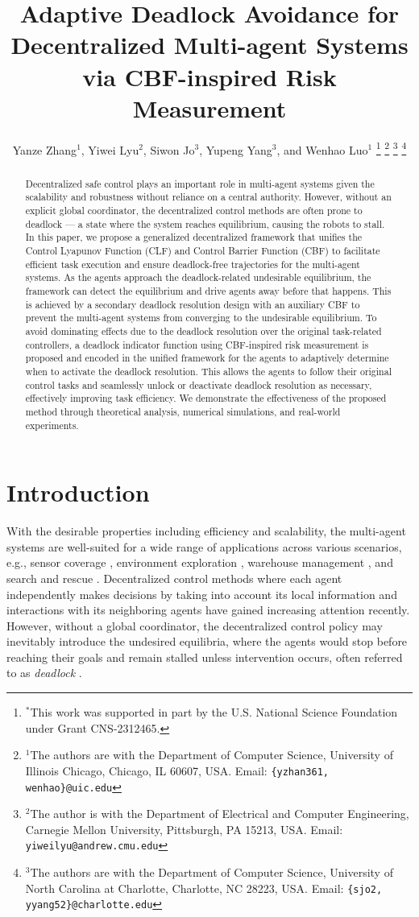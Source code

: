 \documentclass[letterpaper, 10 pt, conference]{ieeeconf}
\title{\LARGE \bf
Adaptive Deadlock Avoidance for Decentralized Multi-agent Systems via CBF-inspired Risk Measurement
}
\author{Yanze Zhang$^{1}$, Yiwei Lyu$^{2}$, Siwon Jo$^{3}$, Yupeng Yang$^{3}$, and Wenhao Luo$^{1}$
\thanks{$^*$This work was supported in part by the U.S. National Science Foundation under Grant CNS-2312465.}
\thanks{$^{1}$The authors are with the Department of Computer Science, University of Illinois Chicago, Chicago, IL 60607, USA. Email: {\tt\small \{yzhan361, wenhao\}@uic.edu}}
\thanks{$^{2}$The author is with the Department of Electrical and Computer Engineering, Carnegie Mellon University,
        Pittsburgh, PA 15213, USA. Email:
        {\tt\small yiweilyu@andrew.cmu.edu}}
\thanks{$^{3}$The authors are with the Department of Computer Science, University of North Carolina at Charlotte, Charlotte, NC 28223, USA. Email:
        {\tt\small \{sjo2, yyang52\}@charlotte.edu}}
}
\theoremstyle{plain}
\begin{document}
\maketitle
\thispagestyle{empty}
\pagestyle{empty}



\begin{abstract}
Decentralized safe control plays an important role in multi-agent systems given the scalability and robustness without reliance on a central authority. However, without an explicit global coordinator, the decentralized control methods are often prone to deadlock ---  a state where the system reaches equilibrium, causing the robots to stall. In this paper, we propose a generalized decentralized framework that unifies the Control Lyapunov Function (CLF) and Control Barrier Function (CBF) to facilitate efficient task execution and ensure deadlock-free trajectories for the multi-agent systems. As the agents approach the deadlock-related undesirable equilibrium, the framework can detect the equilibrium and drive agents away before that happens. This is achieved by a secondary deadlock resolution design with an auxiliary CBF to prevent the multi-agent systems from converging to the undesirable equilibrium. To avoid dominating effects due to the deadlock resolution over the original task-related controllers, a deadlock indicator function using CBF-inspired risk measurement is proposed and encoded in the unified framework for the agents to adaptively determine when to activate the deadlock resolution. This allows the agents to follow their original control tasks and seamlessly unlock or deactivate deadlock resolution as necessary, effectively improving task efficiency. We demonstrate the effectiveness of the proposed method through theoretical analysis, numerical simulations, and real-world experiments.
\end{abstract}


\section{Introduction}
With the desirable properties including efficiency and scalability, the multi-agent systems are well-suited for a wide range of applications across various scenarios, e.g., sensor coverage \cite{luo2018adaptive}, environment exploration \cite{banfi2016asynchronous}, warehouse management \cite{bolu2021adaptive}, and search and rescue \cite{baxter2007multi}. 
Decentralized control methods where each agent independently makes decisions by taking into account its local information and interactions with its neighboring agents have gained increasing attention recently. However, without a global coordinator, the decentralized control policy may inevitably introduce the undesired equilibria, where the agents would 
stop before reaching their goals and remain stalled unless intervention occurs,
often referred to as \emph{deadlock} \cite{grover2023before, wang2017safety, celi2019deconfliction}.
\end{document}
